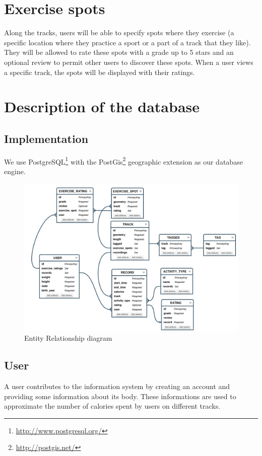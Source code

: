\documentclass[a4paper]{article}
\begin{document}
\section{Exercise spots}

Along the tracks, users will be able to specify spots where they exercise (a specific location where they practice a sport or a part of a track that they like). They will be allowed to rate these spots with a grade up to 5 stars and an optional review to permit other users to discover these spots.
When a user views a specific track, the spots will be displayed with their ratings.

\section{Description of the database}

\subsection{Implementation}
We use PostgreSQL\footnote{\url{http://www.postgresql.org/}} with the PostGis\footnote{\url{http://postgis.net/}} geographic extension as our database engine.

\begin{figure}[h]
    \includegraphics[width=\textwidth]{er-diagram.png}
    \caption{Entity Relationship diagram}
\end{figure}


\subsection{User}
A user contributes to the information system by creating an account and providing
some information about its body. These informations are used to approximate the
number of calories spent by users on different tracks.
\end{document}
